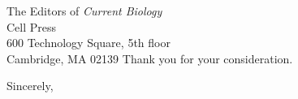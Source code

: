 \documentclass[12pt]{letter}
\begin{document}
\begin{letter}{The Editors of \emph{Current Biology} \\
  Cell Press \\
  600 Technology Square, 5th floor \\
  Cambridge, MA 02139}
Thank you for your consideration.



\closing{Sincerely, \\ $ $ \\    %
 \\
}

\end{letter}
\end{document}
